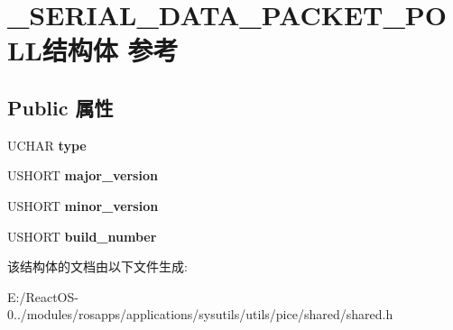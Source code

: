 \hypertarget{struct___s_e_r_i_a_l___d_a_t_a___p_a_c_k_e_t___p_o_l_l}{}\section{\+\_\+\+S\+E\+R\+I\+A\+L\+\_\+\+D\+A\+T\+A\+\_\+\+P\+A\+C\+K\+E\+T\+\_\+\+P\+O\+L\+L结构体 参考}
\label{struct___s_e_r_i_a_l___d_a_t_a___p_a_c_k_e_t___p_o_l_l}
\subsection*{Public 属性}
\begin{DoxyCompactItemize}
\item 
\mbox{\label{struct___s_e_r_i_a_l___d_a_t_a___p_a_c_k_e_t___p_o_l_l_a618a2d0960c61c59841a96f3d35b1cda}} 
U\+C\+H\+AR {\bfseries type}
\item 
\mbox{\label{struct___s_e_r_i_a_l___d_a_t_a___p_a_c_k_e_t___p_o_l_l_a4508f3ce60214985e8270f35cc76cff0}} 
U\+S\+H\+O\+RT {\bfseries major\+\_\+version}
\item 
\mbox{\label{struct___s_e_r_i_a_l___d_a_t_a___p_a_c_k_e_t___p_o_l_l_a7079f940f523227fbc306b68bce237e5}} 
U\+S\+H\+O\+RT {\bfseries minor\+\_\+version}
\item 
\mbox{\label{struct___s_e_r_i_a_l___d_a_t_a___p_a_c_k_e_t___p_o_l_l_ab2897f4979b871a17de79e9818f189cf}} 
U\+S\+H\+O\+RT {\bfseries build\+\_\+number}
\end{DoxyCompactItemize}


该结构体的文档由以下文件生成\+:\begin{DoxyCompactItemize}
\item 
E\+:/\+React\+O\+S-\/0../modules/rosapps/applications/sysutils/utils/pice/shared/shared.\+h\end{DoxyCompactItemize}
